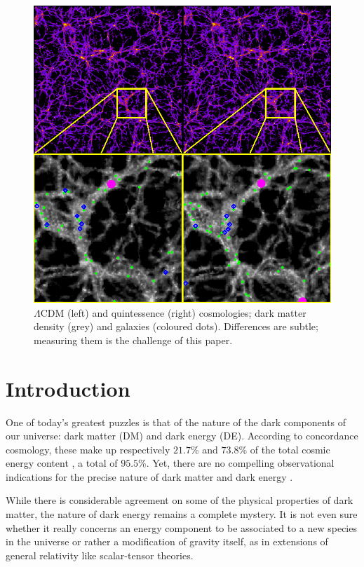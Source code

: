 
\begin{figure}
 \includegraphics[width=\textwidth]{ch_voidsde/img/front_image}
 \caption{$\Lambda$CDM (left) and quintessence (right) cosmologies; dark matter density (grey) and galaxies (coloured dots). Differences are subtle; measuring them is the challenge of this paper.}
\label{fig:haloes}
\end{figure}

\section{Introduction}
\label{sec:intro}

One of today's greatest puzzles is that of the nature of the dark components of our universe: dark matter (DM) and dark 
energy (DE). According to concordance cosmology, these make up respectively $21.7$\% and $73.8$\% of the total cosmic energy 
content \citep{komatsu11}, a total of $95.5$\%. Yet, there are no compelling observational indications for 
the precise nature of dark matter and dark energy \citep{komatsu11, amanullah10}.

While there is considerable agreement on some of the physical properties of dark matter, the nature of dark energy remains a
complete mystery. It is not even sure whether it really concerns an energy component to be associated to a new species in the
universe or rather a modification of gravity itself, as in extensions of general relativity like scalar-tensor theories.

